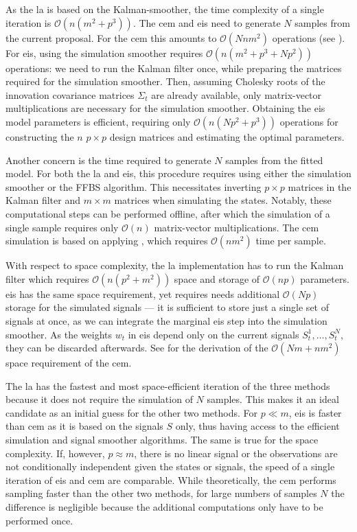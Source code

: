 As the \gls{la} is based on the Kalman-smoother, the time complexity of a single iteration is $\mathcal O(n(m^{2} + p^{3}))$. The \gls{cem} and \gls{eis} need to generate $N$ samples from the current proposal. For the \gls{cem} this amounts to $\mathcal O(Nn m^{2})$ operations (see ). For \gls{eis}, using the simulation smoother \citep{Durbin2002Simple} requires $\mathcal O (n(m^{2} + p^{3} + Np^2))$ operations: we need to run the Kalman filter once, while preparing the matrices required for the simulation smoother. Then, assuming Cholesky roots of the innovation covariance matrices $\Sigma_{t}$ are already available, only matrix-vector multiplications are necessary for the simulation smoother. Obtaining the \gls{eis} model parameters is efficient, requiring only $\mathcal O(n(Np^2 + p^{3}))$ operations for constructing the $n$ $p\times p$ design matrices and estimating the optimal parameters. 

Another concern is the time required to generate $N$ samples from the fitted model. For both the \gls{la} and \gls{eis}, this procedure requires using either the simulation smoother or the FFBS algorithm. This necessitates inverting $p\times p$ matrices in the Kalman filter and $m \times m$ matrices when simulating the states. Notably, these computational steps can be performed offline, after which the simulation of a single sample requires only $\mathcal O(n)$ matrix-vector multiplications. The \gls{cem} simulation is based on applying , which requires $\mathcal O(nm^{2})$ time per sample. 

With respect to space complexity, the \gls{la} implementation has to run the Kalman filter which requires $\mathcal O(n (p^{2} + m^{2}))$ space and storage of $\mathcal O(n p)$ parameters. 
\gls{eis} has the same space requirement, yet requires needs additional $\mathcal O(Np)$ storage for the simulated signals --- it is sufficient to store just a single set of signals at once, as we can integrate the marginal \acrshort{eis} step into the simulation smoother. As the weights $w_{t}$ in \gls{eis} depend only on the current signals $S^{1}_{t}, \dots, S^{N}_{t}$, they can be discarded afterwards. See  for the derivation of the $\mathcal O(Nm + nm^{2})$ space requirement of the \gls{cem}.

The \gls{la} has the fastest and most space-efficient iteration of the three methods because it does not require the simulation of $N$ samples. This makes it an ideal candidate as an initial guess for the other two methods. 
For $p \ll m$, \gls{eis} is faster than \gls{cem} as it is based on the signals $S$ only, thus having access to the efficient simulation and signal smoother algorithms. The same is true for the space complexity. If, however, $p\approx m$, there is no linear signal or the observations are not conditionally independent given the states or signals, the speed of a single iteration of \gls{eis} and \gls{cem} are comparable. 
While theoretically, the \gls{cem} performs sampling faster than the other two methods, for large numbers of samples $N$ the difference is negligible because the additional computations only have to be performed once. 

